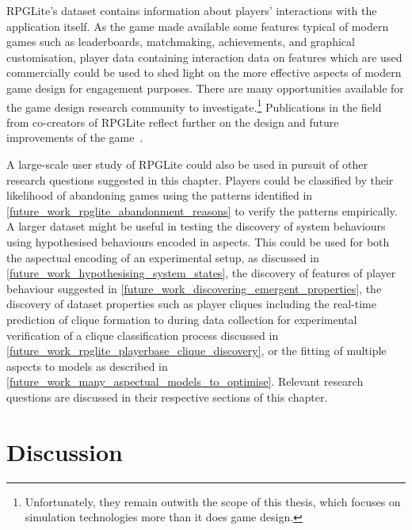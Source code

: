 RPGLite's dataset contains information about players' interactions with the
application itself. As the game made available some features typical of modern
games such as leaderboards, matchmaking, achievements, and graphical
customisation, player data containing interaction data on features which are
used commercially could be used to shed light on
the more effective aspects of modern game design for engagement purposes. 
There are many opportunities available for the game
design research community to investigate.\footnote{Unfortunately, they remain
outwith the scope of this thesis, which focuses on simulation technologies more
than it does game design.} Publications in the field from
co-creators of RPGLite reflect further on the design and future improvements of
the game~\cite{GameOn2020,kavanagh2020,kavanagh2021thesis,kavanagh2019balancing,kavanagh2021gameplay}.

A large-scale user study of RPGLite could also be used in pursuit of other
research questions suggested in this chapter. Players could be classified by
their likelihood of abandoning games using the patterns identified in
\cref{future_work_rpglite_abandonment_reasons} to verify the patterns
empirically. A larger dataset might be useful in testing the discovery of system
behaviours using hypothesised behaviours encoded in aspects. This could be used
for both the aspectual encoding of an experimental setup, as discussed in
\cref{future_work_hypothesising_system_states}, the discovery of features of
player behaviour suggested in
\cref{future_work_discovering_emergent_properties}, the discovery of dataset
properties such as player cliques including the real-time prediction of clique
formation to during data collection for experimental verification of a clique
classification process discussed in
\cref{future_work_rpglite_playerbase_clique_discovery}, or the fitting of
multiple aspects to models as described in
\cref{future_work_many_aspectual_models_to_optimise}. Relevant research
questions are discussed in their respective sections of this chapter.



\section{Discussion}\label{sec:future_work_conclusion}

